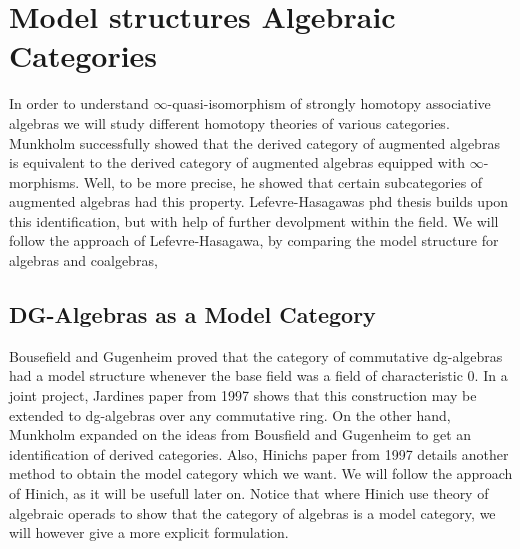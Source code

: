 \documentclass[../thesis.tex]{subfiles}
\begin{document}
    \section{Model structures Algebraic Categories}

            In order to understand $\infty$-quasi-isomorphism of strongly homotopy associative algebras we will study different homotopy theories of various categories. Munkholm \cite{Munkholm78} successfully showed that the derived category of augmented algebras is equivalent to the derived category of augmented algebras equipped with $\infty$-morphisms. Well, to be more precise, he showed that certain subcategories of augmented algebras had this property. Lefevre-Hasagawas phd thesis \cite{LefevreHasegawa03} builds upon this identification, but with help of further devolpment within the field. We will follow the approach of Lefevre-Hasagawa, by comparing the model structure for algebras and coalgebras,

        \subsection{DG-Algebras as a Model Category}

            Bousefield and Gugenheim \cite{Bousfield76} proved that the category of commutative dg-algebras had a model structure whenever the base field was a field of characteristic $0$. In a joint project, Jardines paper from 1997 \cite{Jardine97} shows that this construction may be extended to dg-algebras over any commutative ring. On the other hand, Munkholm expanded on the ideas from Bousfield and Gugenheim to get an identification of derived categories. Also, Hinichs paper from 1997 \cite{Hinich97} details another method to obtain the model category which we want. We will follow the approach of Hinich, as it will be usefull later on. Notice that where Hinich use theory of algebraic operads to show that the category of algebras is a model category, we will however give a more explicit formulation.
\end{document}
